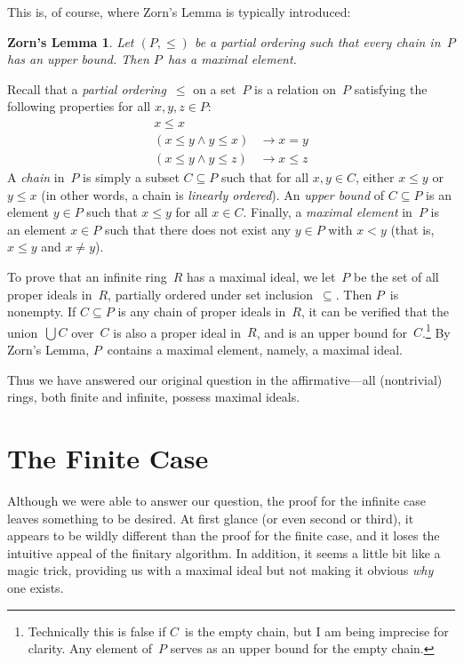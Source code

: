 \documentclass[letterpaper]{article}
\newcommand{\limplies}{\rightarrow}
\newcommand{\bigunion}{\bigcup}
\newtheorem*{ZL}{Zorn's Lemma}
\begin{document}
This is, of course, where Zorn's Lemma is typically introduced:
\begin{ZL}
Let $(P,\le)$ be a partial ordering such that every chain in~$P$ has an upper bound. Then $P$~has a maximal element.
\end{ZL}
\noindent Recall that a \emph{partial ordering}~$\le$ on a set~$P$ is a relation on~$P$ satisfying the following properties for all $x,y,z\in P$:
\begin{align*}
x\le x&\\
(x\le y\land y\le x)&\limplies x=y\\
(x\le y\land y\le z)&\limplies x\le z
\end{align*}
A \emph{chain} in~$P$ is simply a subset $C\subseteq P$ such that for all $x,y\in C$, either $x\le y$ or $y\le x$ (in other words, a chain is \emph{linearly ordered}). An \emph{upper bound} of $C\subseteq P$ is an element $y\in P$ such that $x\le y$ for all $x\in C$. Finally, a \emph{maximal element} in~$P$ is an element $x\in P$ such that there does not exist any $y\in P$ with $x<y$ (that is, $x\le y$ and $x\ne y$).

To prove that an infinite ring~$R$ has a maximal ideal, we let~$P$ be the set of all proper ideals in~$R$, partially ordered under set inclusion~$\subseteq$. Then $P$~is nonempty. If $C\subseteq P$ is any chain of proper ideals in~$R$, it can be verified that the union~$\bigunion C$ over~$C$ is also a proper ideal in~$R$, and is an upper bound for~$C$.\footnote{Technically this is false if $C$~is the empty chain, but I am being imprecise for clarity. Any element of~$P$ serves as an upper bound for the empty chain.} By Zorn's Lemma, $P$~contains a maximal element, namely, a maximal ideal.

Thus we have answered our original question in the affirmative---all (nontrivial) rings, both finite and infinite, possess maximal ideals.

\section*{The Finite Case}
Although we were able to answer our question, the proof for the infinite case leaves something to be desired. At first glance (or even second or third), it appears to be wildly different than the proof for the finite case, and it loses the intuitive appeal of the finitary algorithm. In addition, it seems a little bit like a magic trick, providing us with a maximal ideal but not making it obvious \emph{why} one exists.
\end{document}
